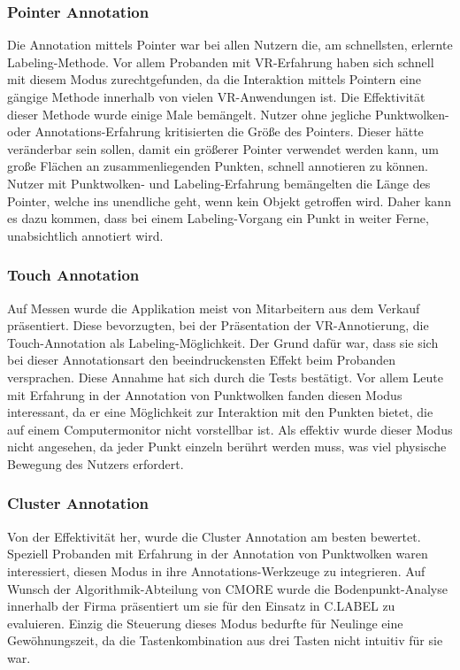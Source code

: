 \subsubsection{Pointer Annotation}
Die Annotation mittels Pointer war bei allen Nutzern die, am schnellsten, erlernte Labeling-Methode. Vor allem Probanden mit VR-Erfahrung haben sich schnell mit diesem Modus zurechtgefunden, da die Interaktion mittels Pointern eine gängige Methode innerhalb von vielen VR-Anwendungen ist. Die Effektivität dieser Methode wurde einige Male bemängelt. Nutzer ohne jegliche Punktwolken- oder Annotations-Erfahrung kritisierten die Größe des Pointers. Dieser hätte veränderbar sein sollen, damit ein größerer Pointer verwendet werden kann, um große Flächen an zusammenliegenden Punkten, schnell annotieren zu können. Nutzer mit Punktwolken- und Labeling-Erfahrung bemängelten die Länge des Pointer, welche ins unendliche geht, wenn kein Objekt getroffen wird. Daher kann es dazu kommen, dass bei einem Labeling-Vorgang ein Punkt in weiter Ferne, unabsichtlich annotiert wird.

\subsubsection{Touch Annotation}
Auf Messen wurde die Applikation meist von Mitarbeitern aus dem Verkauf präsentiert. Diese bevorzugten, bei der Präsentation der VR-Annotierung, die Touch-Annotation als Labeling-Möglichkeit. Der Grund dafür war, dass sie sich bei dieser Annotationsart den beeindruckensten Effekt beim Probanden versprachen. Diese Annahme hat sich durch die Tests bestätigt. Vor allem Leute mit Erfahrung in der Annotation von Punktwolken fanden diesen Modus interessant, da er eine Möglichkeit zur Interaktion mit den Punkten bietet, die auf einem Computermonitor nicht vorstellbar ist. Als effektiv wurde dieser Modus nicht angesehen, da jeder Punkt einzeln berührt werden muss, was viel physische Bewegung des Nutzers erfordert.  

\subsubsection{Cluster Annotation}
Von der Effektivität her, wurde die Cluster Annotation am besten bewertet. Speziell Probanden mit Erfahrung in der Annotation von Punktwolken
waren interessiert, diesen Modus in ihre Annotations-Werkzeuge zu integrieren. Auf Wunsch der Algorithmik-Abteilung von CMORE wurde die Bodenpunkt-Analyse innerhalb der Firma präsentiert um sie für den Einsatz in C.LABEL zu evaluieren. Einzig die Steuerung dieses Modus bedurfte für Neulinge eine Gewöhnungszeit, da die Tastenkombination aus drei Tasten nicht intuitiv für sie war.


